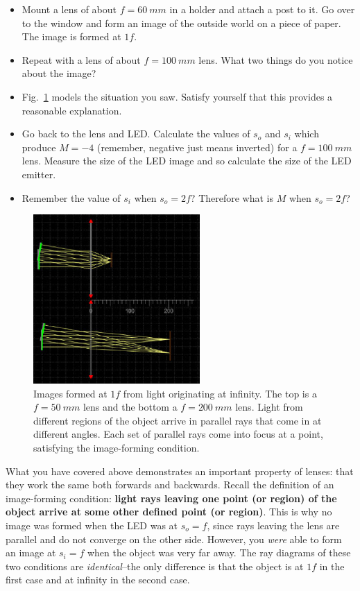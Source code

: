 \documentclass[a4paper]{report}
\begin{document}
\begin{itemize}
\item Mount a lens of about $f=60~mm$ in a holder and attach a post to it. 
Go over to the window and form an image of the outside world on a piece of paper. 
The image is formed at $1f$.
\item Repeat with a lens of about $f=100~mm$ lens. 
What two things do you notice about the image? 
\item Fig.~\ref{fig:outside} models the situation you saw. Satisfy yourself that this provides a reasonable explanation. 
\item Go back to the lens and LED.
Calculate the values of $s_o$ and $s_i$ which produce $M=-4$ (remember, negative just means inverted) for a $f=100~mm$ lens. 
Measure the size of the LED image and so calculate the size of the LED emitter. 
\item Remember the value of $s_i$ when $s_o=2f$? Therefore what is $M$ when $s_o=2f$?
\end{itemize}


\begin{figure}[h]
\center
\includegraphics[width=2.5in]{image_forming_outside.eps}
\caption{Images formed at $1f$ from light originating at infinity. 
The top is a $f=50~mm$ lens and the bottom a $f=200~mm$ lens.
Light from different regions of the object arrive in parallel rays that come in at different angles. 
Each set of parallel rays come into focus at a point, satisfying the image-forming condition. }
\label{fig:outside}
\end{figure}


What you have covered above demonstrates an important property of lenses: that they work the same both forwards and backwards.
Recall the definition of an image-forming condition: \textbf{light rays leaving one point (or region) of the object arrive at some other defined point (or region)}.
This is why no image was formed when the LED was at $s_o=f$, since rays leaving the lens are parallel and do not converge on the other side. 
However, you \textit{were} able to form an image at $s_i=f$ when the object was very far away. 
The ray diagrams of these two conditions are \textit{identical}--the only difference is that the object is at $1f$ in the first case and at infinity in the second case.
\end{document}
